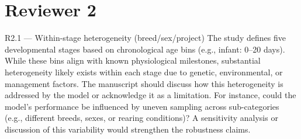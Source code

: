 \documentclass[11pt,a4paper]{article}
\begin{document}
\section*{Reviewer 2}

\begin{reviewerbox}{R2.1 — Within-stage heterogeneity (breed/sex/project)}
The study defines five developmental stages based on chronological age bins
(e.g., infant: 0–20 days). While these bins align with known physiological
milestones, substantial heterogeneity likely exists within each stage due to
genetic, environmental, or management factors. The manuscript should discuss
how this heterogeneity is addressed by the model or acknowledge it as a
limitation. For instance, could the model's performance be influenced by
uneven sampling across sub-categories (e.g., different breeds, sexes, or
rearing conditions)? A sensitivity analysis or discussion of this variability
would strengthen the robustness claims.
\end{reviewerbox}
\end{document}
